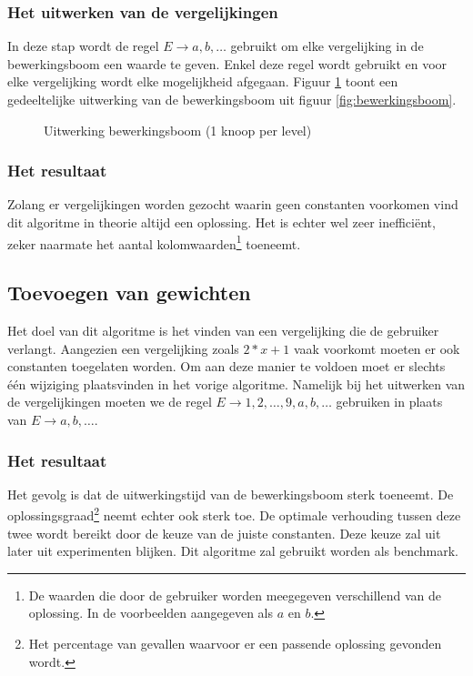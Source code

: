 \documentclass[Main.tex]{subfiles}
\begin{document}
\subsubsection*{Het uitwerken van de vergelijkingen}
In deze stap wordt de regel $E \rightarrow a,b,\dotsc$ gebruikt om elke vergelijking in de bewerkingsboom een waarde te geven. Enkel deze regel wordt gebruikt en voor elke vergelijking wordt elke mogelijkheid afgegaan. Figuur \ref{fig:uitwerkingsboom} toont een gedeeltelijke uitwerking van de bewerkingsboom uit figuur \ref{fig:bewerkingsboom}.
\begin{figure}[!htb]
\centering
{}
\caption{Uitwerking bewerkingsboom (1 knoop per level)} \label{fig:uitwerkingsboom}
\end{figure}
\subsubsection*{Het resultaat}
Zolang er vergelijkingen worden gezocht waarin geen constanten voorkomen vind dit algoritme in theorie altijd een oplossing. Het is echter wel zeer inefficiënt, zeker naarmate het aantal kolomwaarden\footnote{\label{note:kolomwaarden} De waarden die door de gebruiker worden meegegeven verschillend van de oplossing. In de voorbeelden aangegeven als $a$ en $b$.}
toeneemt.
\subsection{Toevoegen van gewichten}
Het doel van dit algoritme is het vinden van een vergelijking die de gebruiker verlangt. Aangezien een vergelijking zoals $2 \ast x+1$ vaak voorkomt moeten er ook constanten toegelaten worden. Om aan deze manier te voldoen moet er slechts één wijziging plaatsvinden in het vorige algoritme. Namelijk bij het uitwerken van de vergelijkingen moeten we de regel $E \rightarrow 1,2,\dotsc,9,a,b,\dotsc$ gebruiken in plaats van $E \rightarrow a,b,\dotsc$.
\subsubsection*{Het resultaat}
Het gevolg is dat de uitwerkingstijd van de bewerkingsboom sterk toeneemt. De oplossingsgraad\footnote{\label{note:oplossingsgraad}Het percentage van gevallen waarvoor er een passende oplossing gevonden wordt.}
neemt echter ook sterk toe. De optimale verhouding tussen deze twee wordt bereikt door de keuze van de juiste constanten. Deze keuze zal uit later uit experimenten blijken. Dit algoritme zal gebruikt worden als benchmark.
\end{document}
